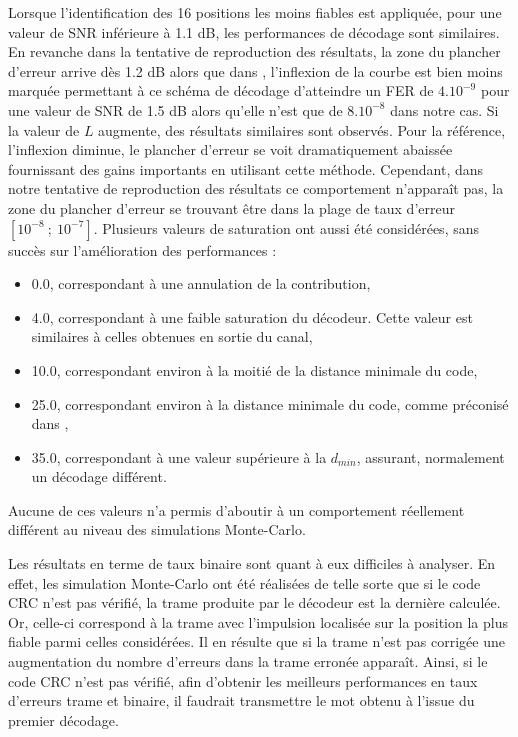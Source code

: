 Lorsque l'identification des 16 positions les moins fiables est appliquée, pour une valeur de SNR inférieure à 1.1 dB, les 
performances de décodage sont similaires. En revanche dans la tentative de reproduction des résultats, la zone du plancher
d'erreur arrive dès 1.2 dB alors que dans \cite{cim}, l'inflexion de la courbe est bien moins marquée permettant à ce 
schéma de décodage d'atteindre un FER de $4.10^{-9}$ pour une valeur de SNR de 1.5 dB alors qu'elle n'est que de $8.10^{-8}$
dans notre cas. Si la valeur de $L$ augmente, des résultats similaires sont observés. Pour la référence, 
l'inflexion diminue, le plancher d'erreur se voit dramatiquement abaissée fournissant des gains importants en utilisant
cette méthode. Cependant, dans notre tentative de reproduction des résultats ce comportement n’apparaît pas, la zone du 
plancher d'erreur se trouvant être dans la plage de taux d'erreur $[10^{-8}~;~10^{-7}]$. Plusieurs valeurs de saturation 
ont aussi été considérées, sans succès sur l'amélioration des performances :
\begin{itemize}
	\item 0.0, correspondant à une annulation de la contribution, 
	\item 4.0, correspondant à une faible saturation du décodeur. Cette valeur est similaires à celles obtenues en sortie du canal,
	\item 10.0, correspondant environ à la moitié de la distance minimale du code,
	\item 25.0, correspondant environ à la distance minimale du code, comme préconisé dans \cite{cim, fsm},
	\item 35.0, correspondant à une valeur supérieure à la $d_{min}$, assurant, normalement un décodage différent.
\end{itemize}
Aucune de ces valeurs n'a permis d'aboutir à un comportement réellement différent au niveau des simulations Monte-Carlo.

Les résultats en terme de taux binaire sont quant à eux difficiles à analyser. En effet, les simulation Monte-Carlo 
ont été réalisées de telle sorte que si le code CRC n'est pas vérifié, la trame produite par le décodeur est la dernière calculée.
Or, celle-ci correspond à la trame avec l'impulsion localisée sur la position la plus fiable parmi celles considérées. 
Il en résulte que si la trame n'est pas corrigée une augmentation du nombre d'erreurs dans la trame erronée apparaît. Ainsi, 
si le code CRC n'est pas vérifié, afin d'obtenir les meilleurs performances en taux d'erreurs trame et binaire, il faudrait 
transmettre le mot obtenu à l'issue du premier décodage.

